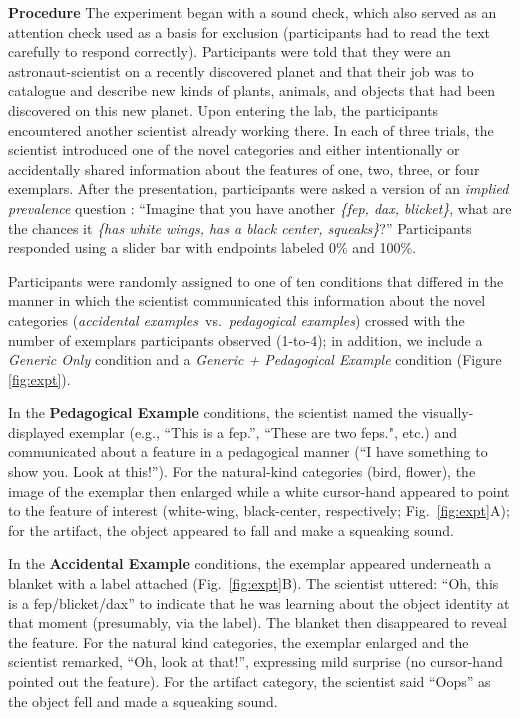 \documentclass[10pt,letterpaper]{article}
\begin{document}
\noindent\textbf{Procedure}
%
The experiment began with a sound check, which also served as an attention check used as a basis for exclusion (participants had to read the text carefully to respond correctly). 
Participants were told that they were an astronaut-scientist on a recently discovered planet and that their job was to catalogue and describe new kinds of plants, animals, and objects that had been discovered on this new planet.  
Upon entering the lab, the participants encountered another scientist already working there. 
In each of three trials, the scientist introduced one of the novel categories and either intentionally or accidentally shared information about the features of one, two, three, or four exemplars. 
After the presentation, participants were asked a version of an \emph{implied prevalence} question \cite{Gelman2002, Cimpian2010a, tessler2020learning}: ``Imagine that you have another \emph{\{fep, dax, blicket\}}, what are the chances it \emph{\{has white wings, has a black center, squeaks\}}?'' 
Participants responded using a slider bar with endpoints labeled 0\% and 100\%.



Participants were randomly assigned to one of ten conditions that differed in the manner in which the scientist communicated this information about the novel categories (\emph{accidental examples}~vs.~\emph{pedagogical examples}) crossed with the number of exemplars participants observed (1-to-4); in addition, we include a \emph{Generic Only} condition and a \emph{Generic + Pedagogical Example} condition (Figure \ref{fig:expt}). 





In the \textbf{Pedagogical Example} conditions, the scientist named the visually-displayed exemplar (e.g., ``This is a fep.'', ``These are two feps.", etc.) and communicated about a feature in a pedagogical manner (``I have something to show you. Look at this!''). 
For the natural-kind categories (bird, flower), the image of the exemplar then enlarged while a white cursor-hand appeared to point to the feature of interest (white-wing, black-center, respectively; Fig.~\ref{fig:expt}A); for the artifact, the object appeared to fall and make a squeaking sound. 

In the \textbf{Accidental Example} conditions, the exemplar appeared underneath a blanket with a label attached (Fig.~\ref{fig:expt}B). 
The scientist uttered: ``Oh, this is a fep/blicket/dax'' to indicate that he was learning about the object identity at that moment (presumably, via the label).
The blanket then disappeared to reveal the feature.
For the natural kind categories, the exemplar enlarged and the scientist remarked, ``Oh, look at that!'', expressing mild surprise (no cursor-hand pointed out the feature). 
For the artifact category, the scientist said ``Oops'' as the object fell and made a squeaking sound.
\end{document}
